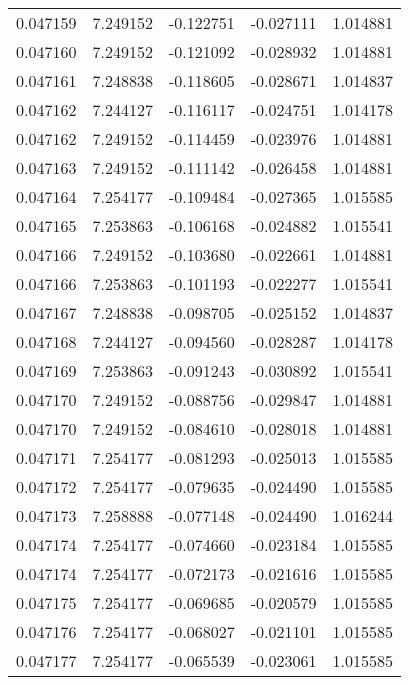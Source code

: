 \begin{tabular}{lrrrr}
0.047159    &  7.249152 & -0.122751 & -0.027111 &             1.014881 \\
0.047160    &  7.249152 & -0.121092 & -0.028932 &             1.014881 \\
0.047161    &  7.248838 & -0.118605 & -0.028671 &             1.014837 \\
0.047162    &  7.244127 & -0.116117 & -0.024751 &             1.014178 \\
0.047162    &  7.249152 & -0.114459 & -0.023976 &             1.014881 \\
0.047163    &  7.249152 & -0.111142 & -0.026458 &             1.014881 \\
0.047164    &  7.254177 & -0.109484 & -0.027365 &             1.015585 \\
0.047165    &  7.253863 & -0.106168 & -0.024882 &             1.015541 \\
0.047166    &  7.249152 & -0.103680 & -0.022661 &             1.014881 \\
0.047166    &  7.253863 & -0.101193 & -0.022277 &             1.015541 \\
0.047167    &  7.248838 & -0.098705 & -0.025152 &             1.014837 \\
0.047168    &  7.244127 & -0.094560 & -0.028287 &             1.014178 \\
0.047169    &  7.253863 & -0.091243 & -0.030892 &             1.015541 \\
0.047170    &  7.249152 & -0.088756 & -0.029847 &             1.014881 \\
0.047170    &  7.249152 & -0.084610 & -0.028018 &             1.014881 \\
0.047171    &  7.254177 & -0.081293 & -0.025013 &             1.015585 \\
0.047172    &  7.254177 & -0.079635 & -0.024490 &             1.015585 \\
0.047173    &  7.258888 & -0.077148 & -0.024490 &             1.016244 \\
0.047174    &  7.254177 & -0.074660 & -0.023184 &             1.015585 \\
0.047174    &  7.254177 & -0.072173 & -0.021616 &             1.015585 \\
0.047175    &  7.254177 & -0.069685 & -0.020579 &             1.015585 \\
0.047176    &  7.254177 & -0.068027 & -0.021101 &             1.015585 \\
0.047177    &  7.254177 & -0.065539 & -0.023061 &             1.015585 \\

\end{tabular}
